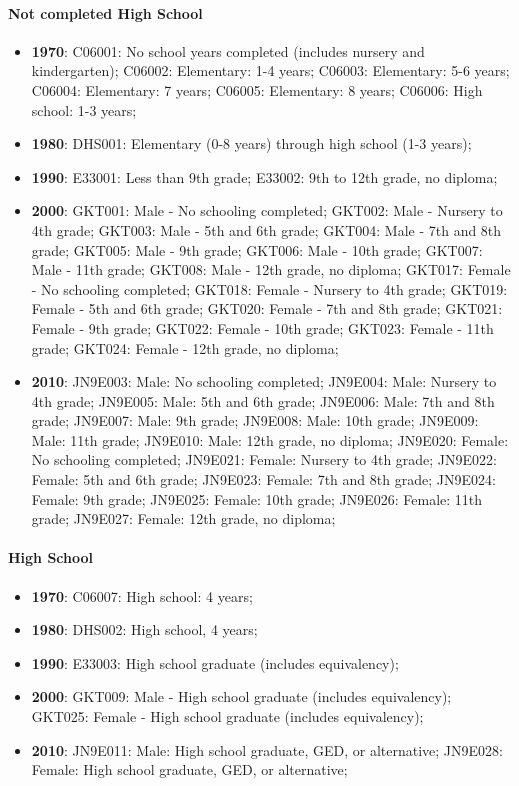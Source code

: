 \documentclass[a4paper]{article}
\begin{document}
\paragraph{Not completed High School}
\begin{itemize}
   \item{\textbf{1970}:  C06001: No school years completed (includes nursery and kindergarten); C06002: Elementary: 1-4 years; C06003: Elementary: 5-6 years; C06004: Elementary: 7 years; C06005: Elementary: 8 years; C06006: High school: 1-3 years;}
   \item{\textbf{1980}:  DHS001: Elementary (0-8 years) through high school (1-3 years);}
   \item{\textbf{1990}:  E33001: Less than 9th grade; E33002: 9th to 12th grade, no diploma;}
   \item{\textbf{2000}:  GKT001: Male - No schooling completed; GKT002: Male - Nursery to 4th grade; GKT003: Male - 5th and 6th grade; GKT004: Male - 7th and 8th grade; GKT005: Male - 9th grade; GKT006: Male - 10th grade; GKT007: Male - 11th grade; GKT008: Male - 12th grade, no diploma; GKT017: Female - No schooling completed; GKT018: Female - Nursery to 4th grade; GKT019: Female - 5th and 6th grade; GKT020: Female - 7th and 8th grade; GKT021: Female - 9th grade; GKT022: Female - 10th grade; GKT023: Female - 11th grade; GKT024: Female - 12th grade, no diploma;}
   \item{\textbf{2010}:  JN9E003: Male: No schooling completed; JN9E004: Male: Nursery to 4th grade; JN9E005: Male: 5th and 6th grade; JN9E006: Male: 7th and 8th grade; JN9E007: Male: 9th grade; JN9E008: Male: 10th grade; JN9E009: Male: 11th grade; JN9E010: Male: 12th grade, no diploma; JN9E020: Female: No schooling completed; JN9E021: Female: Nursery to 4th grade; JN9E022: Female: 5th and 6th grade; JN9E023: Female: 7th and 8th grade; JN9E024: Female: 9th grade; JN9E025: Female: 10th grade; JN9E026: Female: 11th grade; JN9E027: Female: 12th grade, no diploma;}
\end{itemize}

\paragraph{High School}
\begin{itemize}
   \item{\textbf{1970}:  C06007: High school: 4 years;}
   \item{\textbf{1980}:  DHS002: High school, 4 years;}
   \item{\textbf{1990}:  E33003: High school graduate (includes equivalency);}
   \item{\textbf{2000}:  GKT009: Male - High school graduate (includes equivalency); GKT025: Female - High school graduate (includes equivalency);}
   \item{\textbf{2010}:  JN9E011: Male: High school graduate, GED, or alternative; JN9E028: Female: High school graduate, GED, or alternative;}
\end{itemize}
\end{document}
